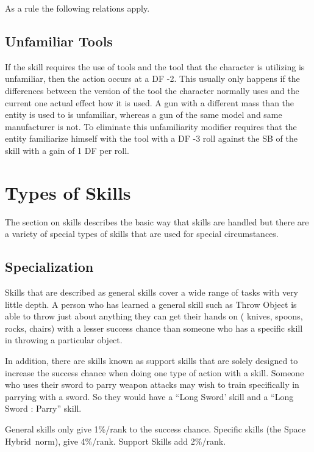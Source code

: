 As a rule the following relations apply.



\subsection{Unfamiliar Tools}

If the skill requires the use of tools and the tool that the character is
utilizing is unfamiliar, then the action occurs at a DF -2. This usually
only happens if the differences between the version of the tool the
character normally uses and the current one actual effect how it is
used. A gun with a different mass than the entity is used to is
unfamiliar, whereas a gun of the same model and same manufacturer is
not. To eliminate this unfamiliarity modifier requires that the entity
familiarize himself with the tool with a DF -3 roll against the SB of 
the skill with a gain of 1 DF per roll. 

\section{Types of Skills}

The section on skills describes the basic way that skills are 
handled but there are a variety of special types of skills that are 
used for special circumstances.

\subsection{Specialization}

Skills that are described as general skills cover a wide range of 
tasks with very little depth. A person who has learned a general 
skill such as Throw Object is able to throw just about anything they 
can get their hands on ( knives, spoons, rocks, chairs) with a lesser 
success chance than someone who has a specific skill in throwing a
particular object.

In addition, there are skills known as support skills that are solely 
designed to increase the success chance when doing one type of action 
with a skill. Someone who uses their sword to parry weapon attacks 
may wish to train specifically in parrying with a sword. So they 
would have a ``Long Sword' skill and a ``Long Sword : Parry'' skill.


General skills only give 1\%/rank to the success chance. Specific 
skills (the Space Hybrid\ norm), give 4\%/rank. Support Skills add 2\%/rank.


